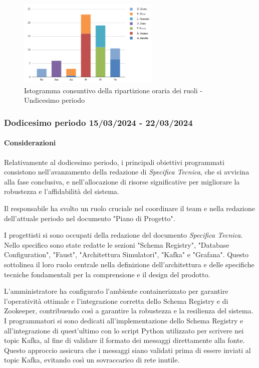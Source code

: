 \begin{figure}[H]
    \centering
    \includegraphics[width=0.6\textwidth]{../Images/consuntivoDivisioneRuoli11Periodo.png}
    \caption{Istogramma consuntivo della ripartizione oraria dei ruoli - Undicesimo periodo}
    \label{fig:Consuntivo_ripartizione_oraria_11}
\end{figure}


\subsubsection{Dodicesimo periodo  15/03/2024 - 22/03/2024}

\paragraph{Considerazioni}
Relativamente al dodicesimo periodo, i principali obiettivi programmati consistono nell'avanzamento della redazione di \textit{Specifica Tecnica}, che si avvicina alla fase conclusiva, e nell'allocazione di risorse significative per migliorare la robustezza e l'affidabilità del sistema.

Il responsabile ha svolto un ruolo cruciale nel coordinare il team e nella redazione dell'attuale periodo nel documento "Piano di Progetto".

I progettisti si sono occupati della redazione del documento \textit{Specifica Tecnica}. Nello specifico sono state redatte le sezioni "Schema Registry", "Database Configuration", "Faust", "Architettura Simulatori", "Kafka" e "Grafana". Questo sottolinea il loro ruolo centrale nella definizione dell'architettura e delle specifiche tecniche fondamentali per la comprensione e il design del prodotto.

L'amministratore ha configurato l'ambiente containerizzato per garantire l'operatività ottimale e l'integrazione corretta dello Schema Registry e di Zookeeper, contribuendo così a garantire la robustezza e la resilienza del sistema.
I programmatori si sono dedicati all'implementazione dello Schema Registry e all'integrazione di quest’ultimo con lo script Python utilizzato per scrivere nei topic Kafka, al fine di validare il formato dei messaggi direttamente alla fonte. Questo approccio assicura che i messaggi siano validati prima di essere inviati al topic Kafka, evitando così un sovraccarico di rete inutile.

